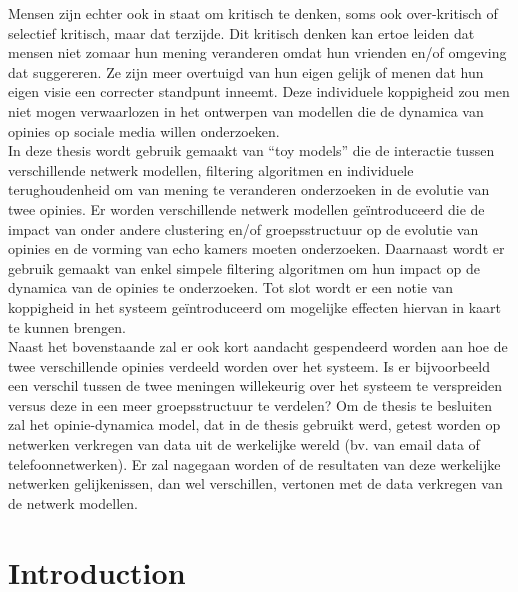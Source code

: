 \documentclass[11 pt , letterpaper , twoside , openright]{book}
\newenvironment{abstract}%
{\cleardoublepage\null \vfill\begin{center}\bfseries \abstractname \end{center}}{\vfill\null}
\begin{document}
\begin{abstract}
Mensen zijn echter ook in staat om kritisch te denken, soms ook over-kritisch of selectief kritisch, maar dat terzijde. Dit kritisch denken kan ertoe leiden dat mensen niet zomaar hun mening veranderen omdat hun vrienden en/of omgeving dat suggereren. Ze zijn meer overtuigd van hun eigen gelijk of menen dat hun eigen visie een correcter standpunt inneemt. Deze individuele koppigheid zou men niet mogen verwaarlozen in het ontwerpen van modellen die de dynamica van opinies op sociale media willen onderzoeken.\\
In deze thesis wordt gebruik gemaakt van ``toy models'' die de interactie tussen verschillende netwerk modellen, filtering algoritmen en individuele terughoudenheid om van mening te veranderen onderzoeken in de evolutie van twee opinies. Er worden verschillende netwerk modellen geïntroduceerd die de impact van onder andere clustering en/of groepsstructuur op de evolutie van opinies en de vorming van echo kamers moeten onderzoeken. Daarnaast wordt er gebruik gemaakt van enkel simpele filtering algoritmen om hun impact op de dynamica van de opinies te onderzoeken. Tot slot wordt er een notie van koppigheid in het systeem geïntroduceerd om mogelijke effecten hiervan in kaart te kunnen brengen. \\
Naast het bovenstaande zal er ook kort aandacht gespendeerd worden aan hoe de twee verschillende opinies verdeeld worden over het systeem. Is er bijvoorbeeld een verschil tussen de twee meningen willekeurig over het systeem te verspreiden versus deze in een meer groepsstructuur te verdelen? Om de thesis te besluiten zal het opinie-dynamica model, dat in de thesis gebruikt werd, getest worden op netwerken verkregen van data uit de werkelijke wereld (bv. van email data of telefoonnetwerken). Er zal nagegaan worden of de resultaten van deze werkelijke netwerken gelijkenissen, dan wel verschillen, vertonen met de data verkregen van de netwerk modellen.
\end{abstract}

\restoregeometry
{}
\tableofcontents
{}
\listoffigures
{}
\restoregeometry

\mainmatter



\pagestyle{fancy}
\fancyhf{}
\lhead{\textcolor{NavyBlue}{\chaptername} \ \textcolor{NavyBlue}{\thechapter}}
\rhead{\rightmark}
\cfoot{\thepage}

\chapter{Introduction}
\end{document}
